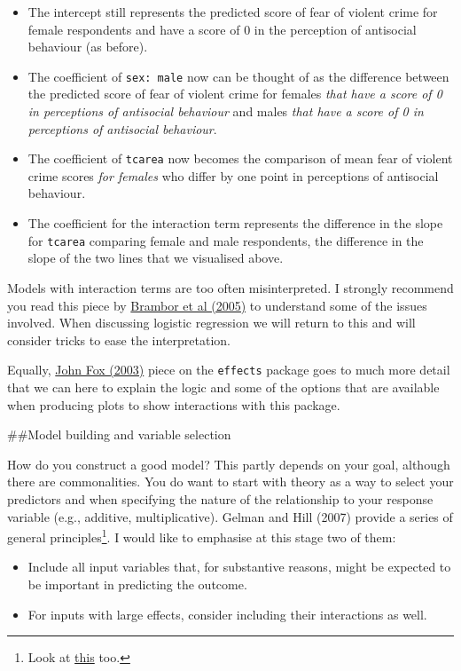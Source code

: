 \documentclass[]{book}
\let\rmarkdownfootnote\footnote%
\def\footnote{\protect\rmarkdownfootnote}
\theoremstyle{definition}
\theoremstyle{definition}
\theoremstyle{definition}
\theoremstyle{remark}
\begin{document}
\begin{itemize}
\item
  The intercept still represents the predicted score of fear of violent
  crime for female respondents and have a score of 0 in the perception
  of antisocial behaviour (as before).
\item
  The coefficient of \texttt{sex:\ male} now can be thought of as the
  difference between the predicted score of fear of violent crime for
  females \emph{that have a score of 0 in perceptions of antisocial
  behaviour} and males \emph{that have a score of 0 in perceptions of
  antisocial behaviour}.
\item
  The coefficient of \texttt{tcarea} now becomes the comparison of mean
  fear of violent crime scores \emph{for females} who differ by one
  point in perceptions of antisocial behaviour.
\item
  The coefficient for the interaction term represents the difference in
  the slope for \texttt{tcarea} comparing female and male respondents,
  the difference in the slope of the two lines that we visualised above.
\end{itemize}

Models with interaction terms are too often misinterpreted. I strongly
recommend you read this piece by
\href{https://files.nyu.edu/mrg217/public/pa_final.pdf}{Brambor et al
(2005)} to understand some of the issues involved. When discussing
logistic regression we will return to this and will consider tricks to
ease the interpretation.

Equally, \href{http://www.jstatsoft.org/v08/i15/paper}{John Fox (2003)}
piece on the \texttt{effects} package goes to much more detail that we
can here to explain the logic and some of the options that are available
when producing plots to show interactions with this package.

\#\#Model building and variable selection

How do you construct a good model? This partly depends on your goal,
although there are commonalities. You do want to start with theory as a
way to select your predictors and when specifying the nature of the
relationship to your response variable (e.g., additive, multiplicative).
Gelman and Hill (2007) provide a series of general principles\footnote{Look
  at
  \href{http://www.r-bloggers.com/stop-using-bivariate-correlations-for-variable-selection/}{this}
  too.}. I would like to emphasise at this stage two of them:

\begin{itemize}
\item
  Include all input variables that, for substantive reasons, might be
  expected to be important in predicting the outcome.
\item
  For inputs with large effects, consider including their interactions
  as well.
\end{itemize}
\end{document}
